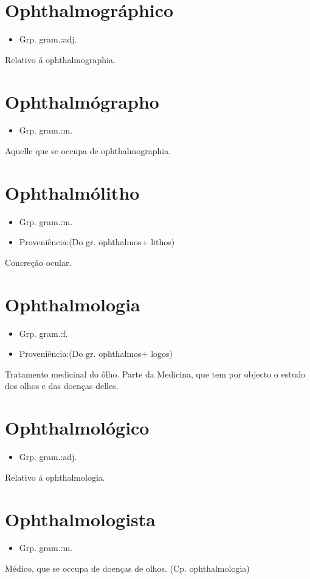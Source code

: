 \section{Ophthalmográphico}
\begin{itemize}
\item {Grp. gram.:adj.}
\end{itemize}
Relativo á ophthalmographia.
\section{Ophthalmógrapho}
\begin{itemize}
\item {Grp. gram.:m.}
\end{itemize}
Aquelle que se occupa de ophthalmographia.
\section{Ophthalmólitho}
\begin{itemize}
\item {Grp. gram.:m.}
\end{itemize}
\begin{itemize}
\item {Proveniência:(Do gr. \textunderscore ophthalmos\textunderscore  + \textunderscore lithos\textunderscore )}
\end{itemize}
Concreção ocular.
\section{Ophthalmologia}
\begin{itemize}
\item {Grp. gram.:f.}
\end{itemize}
\begin{itemize}
\item {Proveniência:(Do gr. \textunderscore ophthalmos\textunderscore  + \textunderscore logos\textunderscore )}
\end{itemize}
Tratamento medicinal do ôlho.
Parte da Medicina, que tem por objecto o estudo dos olhos e das doenças delles.
\section{Ophthalmológico}
\begin{itemize}
\item {Grp. gram.:adj.}
\end{itemize}
Relativo á ophthalmologia.
\section{Ophthalmologista}
\begin{itemize}
\item {Grp. gram.:m.}
\end{itemize}
Médico, que se occupa de doenças de olhos.
(Cp. \textunderscore ophthalmologia\textunderscore )
